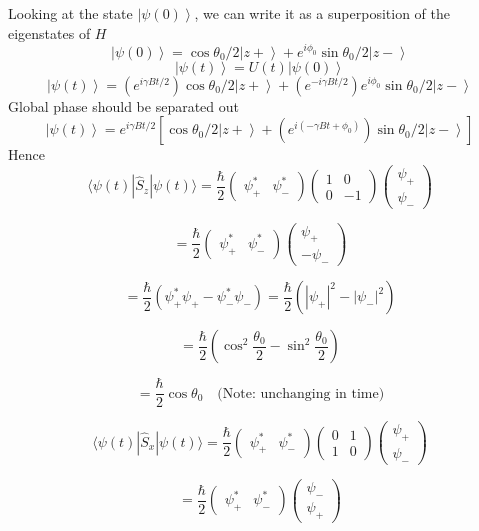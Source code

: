 \documentclass[
]{article}
\providecommand{\ket}[1]{\left\lvert #1 \right\rangle}
\begin{document}
Looking at the state $\ket{\psi(0)}$, we can write it as a superposition of the eigenstates of $H$
\[
	\ket{\psi(0)}=\cos\theta_0/2\ket{z+}+e^{i\phi_0}\sin\theta_0/2\ket{z-}
\]
\[
	\ket{\psi(t)}=U(t)\ket{\psi(0)}
\]
\[
	\ket{\psi(t)}=(e^{i\gamma B t/2})\cos\theta_0/2\ket{z+}+(e^{-i\gamma B t/2})e^{i\phi_0}\sin\theta_0/2\ket{z-}
\]
Global phase should be separated out
\[
	\ket{\psi(t)}=e^{i\gamma B t/2}\left[\cos\theta_0/2\ket{z+}+(e^{i(-\gamma B t+\phi_0)})\sin\theta_0/2\ket{z-}\right]
\]
Hence
\[
	\langle\psi(t)|\hat{S}_z|\psi(t)\rangle = \frac{\hbar}{2}\begin{pmatrix}\psi_+^* & \psi_-^*\end{pmatrix}\begin{pmatrix}1 & 0 \\ 0 & -1\end{pmatrix}\begin{pmatrix}\psi_+ \\ \psi_-\end{pmatrix}
\]

\[
	= \frac{\hbar}{2}\begin{pmatrix}\psi_+^* & \psi_-^*\end{pmatrix}\begin{pmatrix}\psi_+ \\ -\psi_-\end{pmatrix}
\]

\[
	= \frac{\hbar}{2}\left(\psi_+^*\psi_+ - \psi_-^*\psi_-\right) = \frac{\hbar}{2}\left(|\psi_+|^2 - |\psi_-|^2\right)
\]

\[
	= \frac{\hbar}{2}\left(\cos^2\frac{\theta_0}{2} - \sin^2\frac{\theta_0}{2}\right)
\]

\[
	= \frac{\hbar}{2}\cos\theta_0 \quad \text{(Note: unchanging in time)}
\]

\[
	\langle\psi(t)|\hat{S}_x|\psi(t)\rangle = \frac{\hbar}{2}\begin{pmatrix}\psi_+^* & \psi_-^*\end{pmatrix}\begin{pmatrix}0 & 1 \\ 1 & 0\end{pmatrix}\begin{pmatrix}\psi_+ \\ \psi_-\end{pmatrix}
\]

\[
	= \frac{\hbar}{2}\begin{pmatrix}\psi_+^* & \psi_-^*\end{pmatrix}\begin{pmatrix}\psi_- \\ \psi_+\end{pmatrix}
\]
\end{document}
